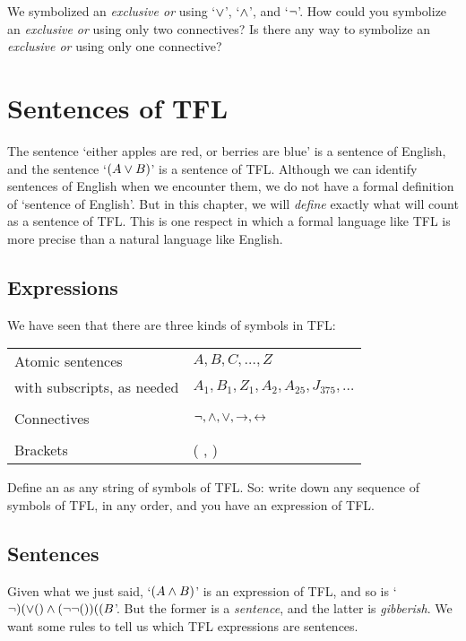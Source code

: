 \problempart
We symbolized an \emph{exclusive or} using `$\vee$', `$\wedge$', and `$\neg$'. How could you symbolize an \emph{exclusive or} using only two connectives? Is there any way to symbolize an \emph{exclusive or} using only one connective?


\chapter{Sentences of TFL}\label{s:TFLSentences}
The sentence `either apples are red, or berries are blue' is a sentence of English, and the sentence `$(A\vee B)$' is a sentence of TFL. Although we can identify sentences of English when we encounter them, we do not have a formal definition of `sentence of English'. But in this chapter, we will \emph{define} exactly what will count as a sentence of TFL. This is one respect in which a formal language like TFL is more precise than a natural language like English.


\section{Expressions}

We have seen that there are three kinds of symbols in TFL:
\begin{center}
\begin{tabular}{l l}
Atomic sentences & $A,B,C,\ldots,Z$\\
with subscripts, as needed & $A_1, B_1,Z_1,A_2,A_{25},J_{375},\ldots$\\
\\
Connectives & $\neg,\wedge,\vee,\rightarrow,\leftrightarrow$\\
\\
Brackets &( , )\\
\end{tabular}
\end{center}
Define an  as any string of symbols of TFL. So: write down any sequence of symbols of TFL, in any order, and you have an expression of TFL.

\section{Sentences}\label{s:Sentences}
Given what we just said, `$(A \wedge B)$' is an expression of TFL, and so is `$\lnot)(\vee()\wedge(\neg\neg())((B$'. But the former is a \emph{sentence}, and the latter is \emph{gibberish}. We want some rules to tell us which TFL expressions are sentences.

